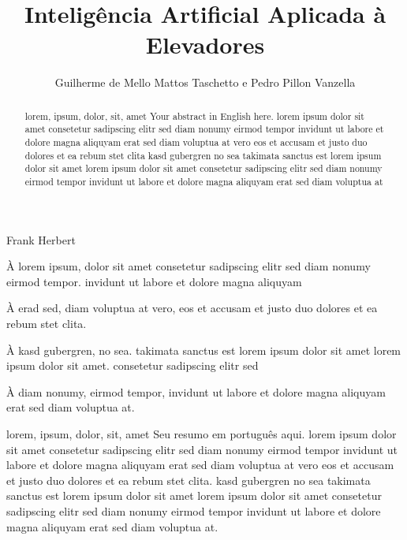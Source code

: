 \documentclass[portuguese,oneside]{tcc}
\author{Guilherme de Mello Mattos Taschetto e Pedro Pillon Vanzella}
\title{Inteligência Artificial Aplicada à Elevadores}
      {Artificial Intelligence Applied to Elevators}
\begin{document}
         {Frank Herbert}

\begin{agradecimentos}
À lorem ipsum, dolor sit amet consetetur sadipscing elitr sed diam
nonumy eirmod tempor. invidunt ut labore et dolore magna aliquyam

À erad sed, diam voluptua at vero, eos et accusam et justo duo
dolores et ea rebum stet clita.

À kasd gubergren, no sea. takimata sanctus est lorem ipsum dolor sit
amet lorem ipsum dolor sit amet. consetetur sadipscing elitr sed

À diam nonumy, eirmod tempor, invidunt ut labore et dolore magna
aliquyam erat sed diam voluptua at.
\end{agradecimentos}

\begin{resumo}{lorem, ipsum, dolor, sit, amet}
Seu resumo em português aqui. lorem ipsum dolor sit amet
consetetur sadipscing elitr sed diam nonumy eirmod tempor invidunt
ut labore et dolore magna aliquyam erat sed diam voluptua at vero
eos et accusam et justo duo dolores et ea rebum stet clita.  kasd
gubergren no sea takimata sanctus est lorem ipsum dolor sit amet
lorem ipsum dolor sit amet consetetur sadipscing elitr sed diam
nonumy eirmod tempor invidunt ut labore et dolore magna aliquyam
erat sed diam voluptua at.
\end{resumo}

\begin{abstract}{lorem, ipsum, dolor, sit, amet}
Your abstract in English here. lorem ipsum dolor sit amet
consetetur sadipscing elitr sed diam nonumy eirmod tempor invidunt
ut labore et dolore magna aliquyam erat sed diam voluptua at vero
eos et accusam et justo duo dolores et ea rebum stet clita kasd
gubergren no sea takimata sanctus est lorem ipsum dolor sit amet
lorem ipsum dolor sit amet consetetur sadipscing elitr sed diam
nonumy eirmod tempor invidunt ut labore et dolore magna aliquyam
erat sed diam voluptua at
\end{abstract}

\tableofcontents










\end{document}
